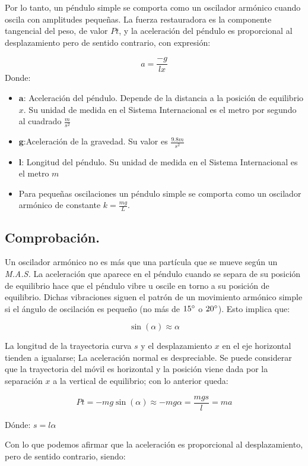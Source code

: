 \documentclass[11pt]{article}
\begin{document}
\begin{multicols}{2}
Por lo tanto, un péndulo simple se comporta como un oscilador armónico cuando oscila con amplitudes pequeñas. La fuerza restauradora es la componente tangencial del peso, de valor $Pt$,  y la aceleración del péndulo es proporcional al desplazamiento pero de sentido contrario, con expresión:

$$a=\frac{-g}{l x}$$
Donde:
\begin{itemize}
	\item $\displaystyle{\textbf{a}}$: Aceleración del péndulo. Depende de la distancia a la posición de equilibrio $x$. Su unidad de medida en el Sistema Internacional es el metro por segundo al cuadrado $\frac{m}{s^2}$\\
	\item $\displaystyle{\textbf{g}}$:Aceleración de la gravedad. Su valor es $\frac{9.8m}{s^2}$
	\item $\displaystyle{\textbf{l}}$: Longitud del péndulo. Su unidad de medida en el Sistema Internacional es el metro $m$
	\item Para pequeñas oscilaciones un péndulo simple se comporta como un oscilador armónico de constante $k=\frac{mg}{L}$.
\end{itemize}
	\subsection{Comprobación.}
	Un oscilador armónico no es más que una partícula que se mueve según un \textit{M.A.S.} La aceleración que aparece en el péndulo cuando se separa de su posición de equilibrio hace que el péndulo vibre u oscile en torno a su posición de equilibrio. Dichas vibraciones siguen el patrón de un movimiento armónico simple si el ángulo de oscilación es pequeño (no más de $15\degree$ o $20\degree$). Esto implica que:

$$\sin{(\alpha)\approx \alpha}$$

La longitud de la trayectoria curva $s$ y el desplazamiento $x$ en el eje horizontal tienden a igualarse; La aceleración normal es despreciable. Se puede considerar que la trayectoria del móvil es horizontal y la posición viene dada por la separación $x$ a la vertical de equilibrio; con lo anterior queda:

$$P t=-mg\sin{(\alpha)}\approx-m g \alpha = \frac{m g s}{l} = m a$$

Dónde: $s=l\alpha$

Con lo que podemos afirmar que la aceleración es proporcional al desplazamiento, pero de sentido contrario, siendo:


\end{multicols}
\end{document}

